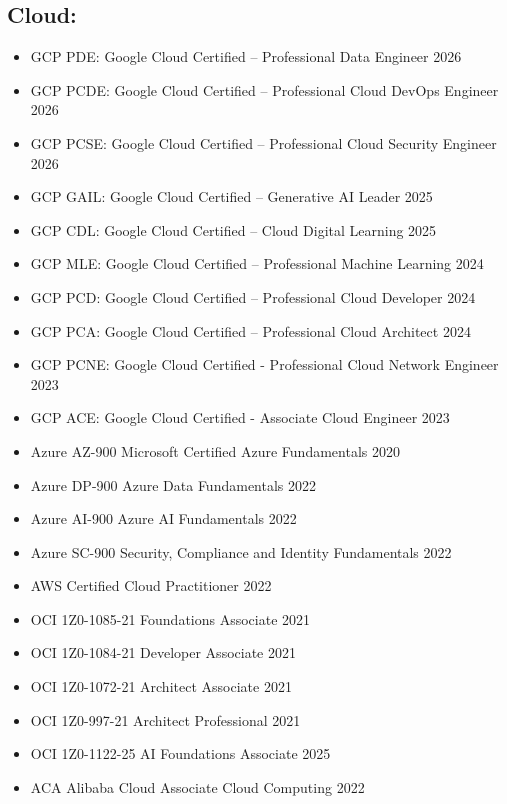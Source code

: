 \documentclass[11pt,a4paper]{article}
\begin{document}
\subsection*{Cloud:}
\begin{itemize}
    \item GCP PDE: Google Cloud Certified -- Professional Data Engineer 2026
    \item GCP PCDE: Google Cloud Certified -- Professional Cloud DevOps Engineer 2026
    \item GCP PCSE: Google Cloud Certified -- Professional Cloud Security Engineer 2026
    \item GCP GAIL: Google Cloud Certified -- Generative AI Leader 2025
    \item GCP CDL: Google Cloud Certified -- Cloud Digital Learning 2025
    \item GCP MLE: Google Cloud Certified -- Professional Machine Learning 2024
    \item GCP PCD: Google Cloud Certified -- Professional Cloud Developer 2024
    \item GCP PCA: Google Cloud Certified -- Professional Cloud Architect 2024
    \item GCP PCNE: Google Cloud Certified - Professional Cloud Network Engineer 2023
    \item GCP ACE: Google Cloud Certified - Associate Cloud Engineer 2023
    \item Azure AZ-900 Microsoft Certified Azure Fundamentals 2020
    \item Azure DP-900 Azure Data Fundamentals 2022
    \item Azure AI-900 Azure AI Fundamentals 2022
    \item Azure SC-900 Security, Compliance and Identity Fundamentals 2022
    \item AWS Certified Cloud Practitioner 2022
    \item OCI 1Z0-1085-21 Foundations Associate 2021
    \item OCI 1Z0-1084-21 Developer Associate 2021
    \item OCI 1Z0-1072-21 Architect Associate 2021
    \item OCI 1Z0-997-21 Architect Professional 2021
    \item OCI 1Z0-1122-25 AI Foundations Associate 2025
    \item ACA Alibaba Cloud Associate Cloud Computing 2022
\end{itemize}
\end{document}
